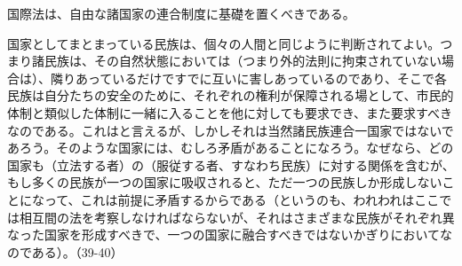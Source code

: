 国際法は、自由な諸国家の連合制度に基礎を置くべきである。

国家としてまとまっている民族は、個々の人間と同じように判断されてよい。つまり諸民族は、その自然状態においては（つまり外的法則に拘束されていない場合は）、隣りあっているだけですでに互いに害しあっているのであり、そこで各民族は自分たちの安全のために、それぞれの権利が保障される場として、市民的体制と類似した体制に一緒に入ることを他に対しても要求でき、また要求すべきなのである。これはと言えるが、しかしそれは当然諸民族連合一国家ではないであろう。そのような国家には、むしろ矛盾があることになろう。なぜなら、どの国家も（立法する者）の（服従する者、すなわち民族）に対する関係を含むが、もし多くの民族が一つの国家に吸収されると、ただ一つの民族しか形成しないことになって、これは前提に矛盾するからである（というのも、われわれはここでは相互間の法を考察しなければならないが、それはさまざまな民族がそれぞれ異なった国家を形成すべきで、一つの国家に融合すべきではないかぎりにおいてなのである）。（39-40）

\subsection{}



